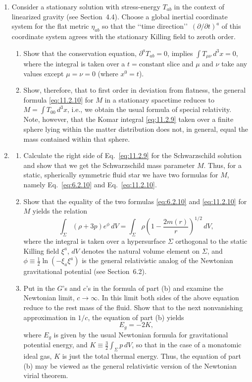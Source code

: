 \begin{enumerate}[label=\arabic*.,leftmargin=2em,itemsep=1.2ex]
\item
Consider a stationary solution with stress-energy \(T_{ab}\) in the context of
linearized gravity (see Section~4.4). Choose a global inertial coordinate system for
the flat metric \(\eta_{ab}\) so that the \lq\lq time direction\rq\rq\
\((\partial/\partial t)^a\) of this coordinate system agrees with the stationary
Killing field to zeroth order.
\begin{enumerate}[label=\alph*),leftmargin=2em,itemsep=.45ex]
\item Show that the conservation equation, \(\partial^aT_{ab}=0\), implies
\(\int T_{\mu\nu}\,d^3x=0\), where the integral is taken over a \(t=\text{constant}\)
slice and \(\mu\) and \(\nu\) take any values except \(\mu=\nu=0\) (where
\(x^0=t\)).
\item Show, therefore, that to first order in deviation from flatness, the general
formula \eqref{eq:11.2.10} for \(M\) in a stationary spacetime reduces to
\(M=\int T_{00}\,d^3x\), i.e., we obtain the usual formula of special relativity.
Note, however, that the Komar integral \eqref{eq:11.2.9} taken over a finite sphere
lying within the matter distribution does not, in general, equal the mass contained
within that sphere.
\end{enumerate}

\item
\begin{enumerate}[label=\alph*),leftmargin=2em,itemsep=.45ex]
\item Calculate the right side of Eq.~\eqref{eq:11.2.9} for the Schwarzschild
solution and show that we get the Schwarzschild mass parameter \(M\). Thus, for a
static, spherically symmetric fluid star we have two formulas for \(M\), namely
Eq.~\eqref{eq:6.2.10} and Eq.~\eqref{eq:11.2.10}.
\item Show that the equality of the two formulas \eqref{eq:6.2.10} and
\eqref{eq:11.2.10} for \(M\) yields the relation
\[
  \int_\Sigma(\rho+3p)e^\phi\,dV
  =\int_\Sigma\rho\left(1-\frac{2m(r)}{r}\right)^{1/2}\,dV,
\]
where the integral is taken over a hypersurface \(\Sigma\) orthogonal to the static
Killing field \(\xi^a\), \(dV\) denotes the natural volume element on \(\Sigma\), and
\(\phi\equiv\tfrac12\ln(-\xi_a\xi^a)\) is the general relativistic analog of the
Newtonian gravitational potential (see Section~6.2).
\item Put in the \(G\)'s and \(c\)'s in the formula of part (b) and examine the
Newtonian limit, \(c\to\infty\). In this limit both sides of the above equation reduce
to the rest mass of the fluid. Show that to the next nonvanishing approximation in
\(1/c\), the equation of part (b) yields
\[
  E_g=-2K,
\]
where \(E_g\) is given by the usual Newtonian formula for gravitational potential
energy, and \(K\equiv\tfrac32\int_\Sigma p\,dV\), so that in the case of a monatomic
ideal gas, \(K\) is just the total thermal energy. Thus, the equation of part (b) may
be viewed as the general relativistic version of the Newtonian virial theorem.
\end{enumerate}


\end{enumerate}
